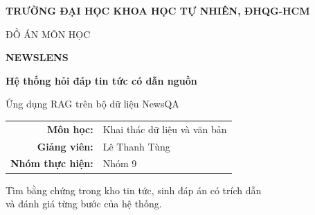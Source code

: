 \begin{frame}[t]
  \vspace{4mm}
  {\fontsize{16}{21}\selectfont\color{brandaccent}\bfseries
  TRƯỜNG ĐẠI HỌC KHOA HỌC TỰ NHIÊN, ĐHQG-HCM\par}
  \vspace{12mm}
  \begin{center}
    {\fontsize{15}{20}\selectfont\color{brandmuted} ĐỒ ÁN MÔN HỌC\par}
    \vspace{4mm}
    {\fontsize{52}{59}\selectfont\bfseries\color{brandaccent} NEWSLENS\par}
    \vspace{3mm}
    {\fontsize{26}{32}\selectfont\bfseries Hệ thống hỏi đáp tin tức có dẫn nguồn\par}
    \vspace{2mm}
    {\fontsize{20}{25}\selectfont Ứng dụng RAG trên bộ dữ liệu NewsQA\par}
    \vspace{10mm}
    {\fontsize{17}{24}\selectfont
    \begin{tabular}{rl}
      \textbf{Môn học:} & Khai thác dữ liệu và văn bản \\
      \textbf{Giảng viên:} & Lê Thanh Tùng \\
      \textbf{Nhóm thực hiện:} & Nhóm 9
    \end{tabular}\par}
    \vspace{7mm}
    {\fontsize{16}{22}\selectfont\color{brandmuted}
    Tìm bằng chứng trong kho tin tức, sinh đáp án có trích dẫn\\
    và đánh giá từng bước của hệ thống.\par}
  \end{center}
\end{frame}
